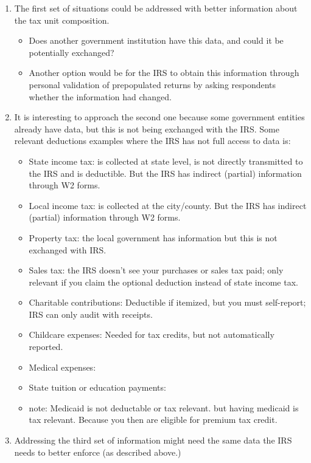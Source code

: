 \documentclass[12pt]{article}
\begin{document}
\begin{enumerate}
    \item The first set of situations could be addressed with better information about the tax unit composition. 
    \begin{itemize}
        \item Does another government institution have this data, and could it be potentially exchanged?
        \item Another option would be for the IRS to obtain this information through personal validation of prepopulated returns by asking respondents whether the information had changed. 
    \end{itemize}
    \item It is interesting to approach the second one because some government entities already have data, but this is not being exchanged with the IRS. Some relevant deductions examples where the IRS has not full access to data is:  
    \begin{itemize}
        \item State income tax: is collected at state level, is not directly transmitted to the IRS and is deductible. But the IRS has indirect (partial) information through W2 forms. 
        \item Local income tax: is collected at the city/county. But the IRS has indirect (partial) information through W2 forms. 
        \item Property tax: the local government has information but this is not exchanged with IRS. 
        \item Sales tax: the IRS doesn’t see your purchases or sales tax paid; only relevant if you claim the optional deduction instead of state income tax.
        \item Charitable contributions: Deductible if itemized, but you must self-report; IRS can only audit with receipts.
        \item Childcare expenses: Needed for tax credits, but not automatically reported.
        \item Medical expenses:
        \item State tuition or education payments:
        \item note: Medicaid is not deductable or tax relevant. but having medicaid is tax relevant. Because you then are eligible for premium tax credit.
\end{itemize}
    \item Addressing the third set of information might need the same data the IRS needs to better enforce (as described above.)
\end{enumerate}
\end{document}

